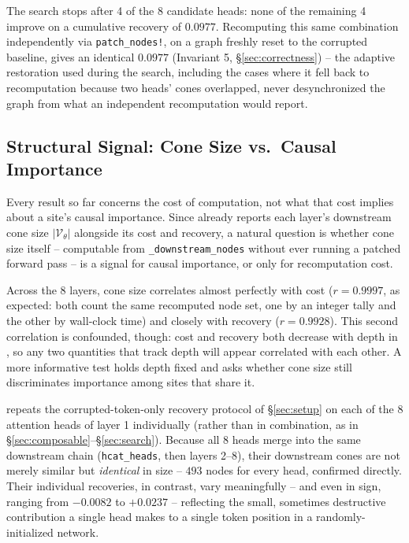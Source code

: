 \documentclass{article}
\begin{document}
The search stops after 4 of the 8 candidate heads: none of the remaining 4 improve on a
cumulative recovery of $0.0977$. Recomputing this same combination independently via
\texttt{patch\_nodes!}, on a graph freshly reset to the corrupted baseline, gives an identical
$0.0977$ (Invariant 5, \S\ref{sec:correctness}) -- the adaptive restoration used during the
search, including the cases where it fell back to recomputation because two heads' cones
overlapped, never desynchronized the graph from what an independent recomputation would report.

\subsection{Structural Signal: Cone Size vs.\ Causal Importance}

Every result so far concerns the cost of computation, not what that cost implies about a site's
causal importance. Since  already reports each layer's downstream cone size
$|\mathcal{V}_\theta|$ alongside its cost and recovery, a natural question is whether cone size
itself -- computable from \texttt{\_downstream\_nodes} without ever running a patched forward
pass -- is a signal for causal importance, or only for recomputation cost.

Across the 8 layers, cone size correlates almost perfectly with cost ($r=0.9997$, as expected:
both count the same recomputed node set, one by an integer tally and the other by wall-clock
time) and closely with recovery ($r=0.9928$). This second correlation is confounded, though: cost
and recovery both decrease with depth in , so any two quantities that track
depth will appear correlated with each other. A more informative test holds depth fixed and asks
whether cone size still discriminates importance among sites that share it.

 repeats the corrupted-token-only recovery protocol of \S\ref{sec:setup} on each
of the 8 attention heads of layer 1 individually (rather than in combination, as in
\S\ref{sec:composable}--\S\ref{sec:search}). Because all 8 heads merge into the same downstream
chain (\texttt{hcat\_heads}, then layers 2--8), their downstream cones are not merely similar but
\emph{identical} in size -- $493$ nodes for every head, confirmed directly. Their individual
recoveries, in contrast, vary meaningfully -- and even in sign, ranging from $-0.0082$ to
$+0.0237$ -- reflecting the small, sometimes destructive contribution a single head makes to a
single token position in a randomly-initialized network.
\end{document}
